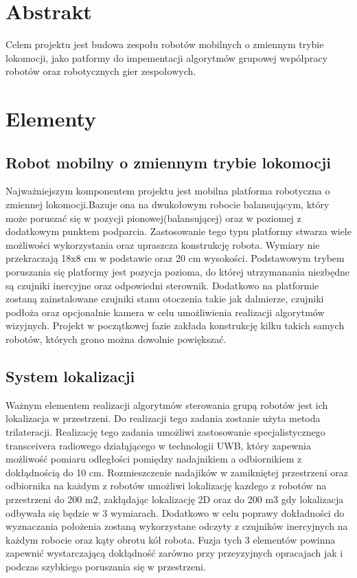 \documentclass[a4paper, 12pt]{article}
\begin{document}
	
\section{Abstrakt}
Celem projektu jest budowa zespołu robotów mobilnych o zmiennym trybie lokomocji, jako patformy do impementacji algorytmów grupowej współpracy robotów oraz robotycznych gier zespołowych.


\section{Elementy}
\subsection{Robot mobilny o zmiennym trybie lokomocji}
Najważniejszym komponentem projektu jest mobilna platforma robotyczna o zmiennej lokomocji.Bazuje ona na dwukołowym robocie balansującym, który może poruszać się w pozycji pionowej(balansującej) oraz w poziomej z dodatkowym punktem podparcia. Zastosowanie tego typu platformy stwarza wiele możliwości wykorzystania oraz upraszcza konstrukcję robota. Wymiary nie przekraczają 18x8 cm w podstawie oraz 20 cm wysokości. Podstawowym trybem poruszania się platformy jest pozycja pozioma, do której utrzymanania niezbędne są czujniki inercyjne oraz odpowiedni sterownik. Dodatkowo na platformie zostaną zainstalowane czujniki stanu otoczenia takie jak dalmierze, czujniki podłoża oraz opcjonalnie kamera w celu umożliwienia realizacji algorytmów wizyjnych. Projekt w początkowej fazie zakłada konstrukcję kilku takich samych robotów, których grono można dowolnie powiększać. 

\subsection{System lokalizacji}
Ważnym elementem realizacji algorytmów sterowania grupą robotów jest ich lokalizacja w przestrzeni. Do realizacji tego zadania zostanie użyta metoda trilateracji. Realizację tego zadania umożliwi zastosowanie specjalistycznego transceivera radiowego działąjącego w technologii UWB, który zapewnia możliwość pomiaru odległości pomiędzy nadajnikiem a odbiornikiem z dokłądnością do 10 cm. Rozmieszczenie nadajików w zamikniętej przestrzeni oraz odbiornika na każdym z robotów umożliwi lokalizację kazdego z robotów na przestrzeni do 200 m2, zakłądając lokalizację 2D oraz do 200 m3 gdy lokalizacja odbywała się będzie w 3 wymiarach. Dodatkowo w celu poprawy dokładności do wyznaczania położenia zostaną wykorzystane odczyty z czujników inercyjnych na każdym robocie oraz kąty obrotu kół robota. Fuzja tych 3 elementów powinna zapewnić wystarczającą dokłądność zarówno przy przeyzyjnych opracajach jak i podczas szybkiego poruszania się w przestrzeni. 
\end{document}
